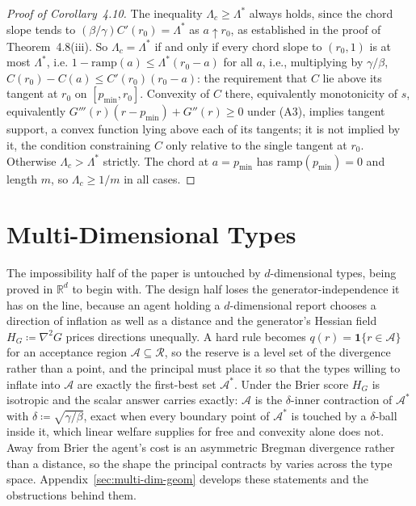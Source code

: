 \documentclass[acmsmall,nonacm,screen]{acmart}
\theoremstyle{acmplain}%
\theoremstyle{acmdefinition}%
\newcommand{\R}{\mathbb{R}}
\newcommand{\calR}{\mathcal{R}}
\numberwithin{equation}{section}
\newcommand{\multidimnote}{Appendix~\ref{sec:multi-dim-geom} develops these statements and the obstructions behind them.}
\begin{document}
\begin{appendix}
\begin{proof}[Proof of Corollary~4.10]
The inequality $\Lambda_c\geq\Lambda^*$ always holds, since the chord slope tends to $(\beta/\gamma)C'(r_0)=\Lambda^*$ as $a\uparrow r_0$, as established in the proof of Theorem~4.8(iii). So $\Lambda_c=\Lambda^*$ if and only if every chord slope to $(r_0,1)$ is at most $\Lambda^*$, i.e. $1-\mathrm{ramp}(a)\leq\Lambda^*(r_0-a)$ for all $a$, i.e., multiplying by $\gamma/\beta$, $C(r_0)-C(a)\leq C'(r_0)(r_0-a)$: the requirement that $C$ lie above its tangent at $r_0$ on $[p_{\min},r_0]$. Convexity of $C$ there, equivalently monotonicity of $s$, equivalently $G'''(r)(r-p_{\min})+G''(r)\geq0$ under (A3), implies tangent support, a convex function lying above each of its tangents; it is not implied by it, the condition constraining $C$ only relative to the single tangent at $r_0$. Otherwise $\Lambda_c>\Lambda^*$ strictly. The chord at $a=p_{\min}$ has $\mathrm{ramp}(p_{\min})=0$ and length $m$, so $\Lambda_c\geq1/m$ in all cases.
\end{proof}
\section{Multi-Dimensional Types}\label{sec:multi-dim}

The impossibility half of the paper is untouched by $d$-dimensional types, being proved in $\R^d$ to begin with. The design half loses the generator-independence it has on the line, because an agent holding a $d$-dimensional report chooses a direction of inflation as well as a distance and the generator's Hessian field $H_G \coloneqq \nabla^2 G$ prices directions unequally. A hard rule becomes $q(r) = \mathbf{1}\{r \in \mathcal{A}\}$ for an acceptance region $\mathcal{A} \subseteq \calR$, so the reserve is a level set of the divergence rather than a point, and the principal must place it so that the types willing to inflate into $\mathcal{A}$ are exactly the first-best set $\mathcal{A}^*$. Under the Brier score $H_G$ is isotropic and the scalar answer carries exactly: $\mathcal{A}$ is the $\delta$-inner contraction of $\mathcal{A}^*$ with $\delta \coloneqq \sqrt{\gamma/\beta}$, exact when every boundary point of $\mathcal{A}^*$ is touched by a $\delta$-ball inside it, which linear welfare supplies for free and convexity alone does not. Away from Brier the agent's cost is an asymmetric Bregman divergence rather than a distance, so the shape the principal contracts by varies across the type space. \multidimnote{}


\end{appendix}
\end{document}
